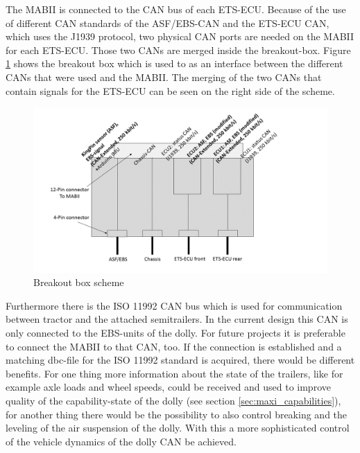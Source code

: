 \documentclass[ExampleMasters.tex]{subfiles}
\begin{document}
The \gls{MABII} is connected to the \gls{CAN} bus of each \gls{ETS}-ECU. Because of the use of different \gls{CAN} standards of the ASF/EBS-\gls{CAN} and the \gls{ETS}-ECU CAN, which uses the J1939 protocol, two physical \gls{CAN} ports are needed on the \gls{MABII} for each \gls{ETS}-\gls{ECU}. Those two \gls{CAN}s are merged inside the breakout-box. Figure \ref{fig:BOB} shows the breakout box which is used to as an interface between the different \gls{CAN}s that were used and the \gls{MABII}. The merging of the two \gls{CAN}s that contain signals for the \gls{ETS}-\gls{ECU} can be seen on the right side of the scheme.\\

\begin{figure}[!htb]
	\centering
	\includegraphics[width=1\linewidth]{figures/BOB_schema}
	\caption{Breakout box scheme}
	\label{fig:BOB}
\end{figure}


	Furthermore there is the ISO 11992 \gls{CAN} bus which is used for communication between tractor and the attached semitrailers. In the current design this \gls{CAN} is only connected to the EBS-units of the dolly. For future projects it is preferable to connect the \gls{MABII} to that \gls{CAN}, too. If the connection is established and a matching dbc-file for the ISO 11992 standard is acquired, there would be different benefits. For one thing more information about the state of the trailers, like for example axle loads and wheel speeds, could be received and used to improve quality of the capability-state of the dolly (see section \ref{sec:maxi_capabilities}), for another thing there would be the possibility to also control breaking and the leveling of the air suspension of the dolly. With this a more sophisticated control of the vehicle dynamics of the dolly \gls{CAN} be achieved.\\	
\end{document}
